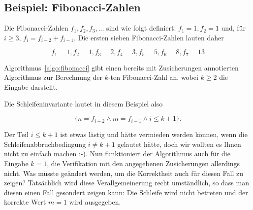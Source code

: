 \vspace{2mm} %

\subsection{Beispiel: Fibonacci-Zahlen}
\label{sec:Kap-11-2-3}

Die Fibonacci-Zahlen $f_1, f_2, f_3, \ldots $ sind wie folgt definiert: $f_1 = 1, f_2 = 1$ und, für $i \geq 3$, $f_i = f_{i-2} + f_{i-1}$. Die ersten sieben Fibonacci-Zahlen lauten daher

$$f_1=1, f_2=1, f_3=2, f_4=3, f_5=5, f_6=8, f_7=13 $$

Algorithmus~\ref{algo:fibonacci} gibt einen bereits mit Zusicherungen annotierten Algorithmus zur Berechnung der $k$-ten Fibonacci-Zahl an, wobei $k \geq 2$ die Eingabe darstellt.


\vspace{2mm} %

Die Schleifeninvariante lautet in diesem Beispiel also

$$\{n=f_{i-2} \wedge m= f_{i-1} \wedge i \leq k+1\}.$$ 

Der Teil $i \leq k+1$ ist etwas lästig und hätte vermieden werden können, wenn die Schleifenabbruchbedingung $i \neq k + 1 $ gelautet hätte, doch wir wollten es Ihnen nicht zu einfach machen :-). Nun funktioniert der Algorithmus auch für die Eingabe $k=1$, die Verifikation mit den angegebenen Zusicherungen allerdings nicht. Was müsste geändert werden, um die Korrektheit auch für diesen Fall zu zeigen? Tatsächlich wird diese Verallgemeinerung recht umständlich, so dass man diesen einen Fall gesondert zeigen kann: Die Schleife wird nicht betreten und der korrekte Wert $m= 1$ wird ausgegeben.

